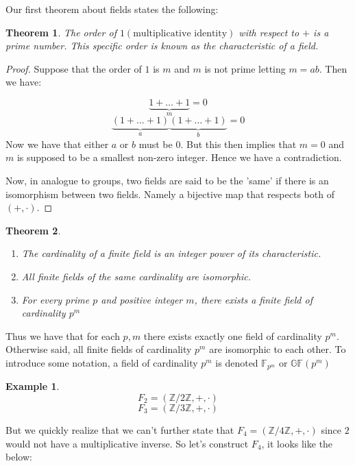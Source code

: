 \documentclass[titlepage]{article}
\newtheorem{theorem}{Theorem}[section]
\newtheorem{example}{Example}[section]
\begin{document}
Our first theorem about fields states the following:

\begin{theorem}
The order of $1(\text{multiplicative identity})$ with respect to $+$ is a prime number. This specific order is known as the characteristic of a field.
\end{theorem}

\begin{proof}
Suppose that the order of $1$ is $m$ and $m$ is not prime letting $m = ab$. Then we have:

$$\underbrace{1 + \hdots + 1}_{m} = 0$$
$$\underbrace{(1 + \hdots + 1)}_{a} \underbrace{(1 + \hdots + 1)}_{b} = 0$$
Now we have that either $a$ or $b$ must be $0$. But this then implies that $m = 0$ and $m$ is supposed to be a smallest non-zero integer. Hence we have a contradiction. 

Now, in analogue to groups, two fields are said to be the 'same' if there is an isomorphism between two fields. Namely a bijective map that respects both of $(+,\cdot)$. 
\end{proof}

\begin{theorem}
\begin{enumerate}
    \item The cardinality of a finite field is an integer power of its characteristic.
    \item All finite fields of the same cardinality are isomorphic.  
    \item For every prime $p$ and positive integer $m$, there exists a finite field of cardinality $p^{m}$
\end{enumerate}
\end{theorem}

Thus we have that for each $p,m$ there exists exactly one field of cardinality $p^{m}$. Otherwise said, all finite fields of cardinality $p^{m}$ are isomorphic to each other. To introduce some notation, a field of cardinality  $p^{m}$ is denoted $\mathbb{F}_{p^{m}}$ or $\mathbb{GF}(p^{m})$

\begin{example}
$$F_{2} = (\mathbb{Z}/2\mathbb{Z}, +, \cdot)$$
$$F_{3} = (\mathbb{Z}/3\mathbb{Z}, +, \cdot)$$
\end{example}

But we quickly realize that we can't further state that $F_{4} = (\mathbb{Z}/4\mathbb{Z}, +, \cdot)$ since $2$ would not have a multiplicative inverse. So let's construct $F_{4}$, it looks like the below: 
\end{document}

